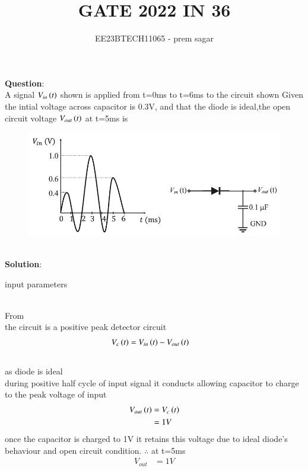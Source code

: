\documentclass[journal,12pt,twocolumn]{IEEEtran}
\theoremstyle{remark}
\begin{document}

\vspace{3cm}

\title{GATE 2022 IN 36}
\author{EE23BTECH11065 - prem sagar}
\maketitle
\newpage

\bigskip

\renewcommand{\thefigure}{\theenumi}
\renewcommand{\thetable}{\theenumi}
\textbf{Question}:
\\A signal $V_{in}\left(t\right)$ shown is applied from t=0ms to t=6ms to the circuit shown Given the intial voltage across capacitor is 0.3V, and that the diode is ideal,the open circuit voltage $V_{out}\left(t\right)$ at t=5ms is
\begin{figure}[h]
\renewcommand\thefigure{1}
    \centering
	\includegraphics[width=1\linewidth]{figs/figuree.png}
    \caption{ }
    \label{fig:enter-label}
\end{figure}
\\\textbf{Solution}:
\begin{table}[!ht]
\def\arraystretch{1.5}
   \centering
    \renewcommand\thetable{1}
      
    \caption{input parameters}
    \label{tab:IN 14}
 \end{table}
\\ From 
\\ the circuit is a positive peak detector circuit  
\begin{align}
V_c\left(t\right)&=V_{in}\left(t\right)-V_{out}\left(t\right)
\end{align}
\\as diode is ideal
\\during positive half cycle of input signal it conducts allowing capacitor to charge to the peak voltage of input  
\begin{align}
V_{out}\left(t\right)&=V_c\left(t\right)
\\&=1V
\end{align}
once the capacitor is charged to 1V it retains this voltage due to ideal diode's behaviour and open circuit condition.
$\therefore$ at t=5ms
\begin{align}
V_{out}&=1V
\end{align}
\end{document}
